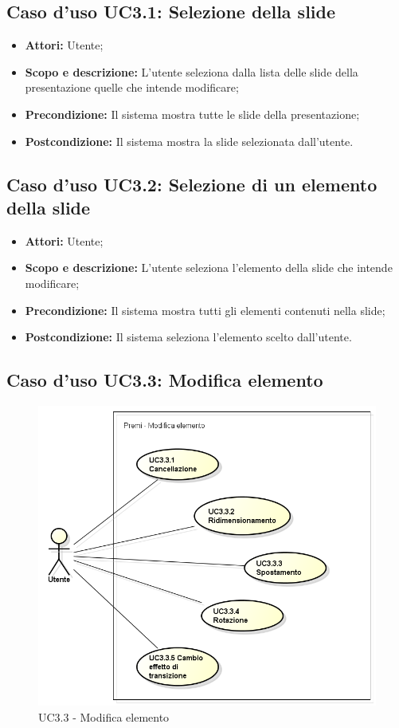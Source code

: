 \subsection{Caso d'uso UC3.1: Selezione della slide}
\begin{itemize}
	\item \textbf{Attori:} Utente;
	\item \textbf{Scopo e descrizione:} L'utente seleziona dalla lista delle slide della presentazione quelle che intende modificare;
	\item \textbf{Precondizione:} Il sistema mostra tutte le slide della presentazione;
	\item \textbf{Postcondizione:} Il sistema mostra la slide selezionata dall'utente.
\end{itemize}

\subsection{Caso d'uso UC3.2: Selezione di un elemento della slide}
\begin{itemize}
	\item \textbf{Attori:} Utente;
	\item \textbf{Scopo e descrizione:} L'utente seleziona l'elemento della slide che intende modificare;
	\item \textbf{Precondizione:} Il sistema mostra tutti gli elementi contenuti nella slide;
	\item \textbf{Postcondizione:} Il sistema seleziona l'elemento scelto dall'utente.
\end{itemize}


\subsection{Caso d'uso UC3.3: Modifica elemento}
\begin{figure}[h] 
	\centering 
	\includegraphics[scale=0.45] {img/UC3.3.png} 
	\caption{UC3.3 - Modifica elemento} 
\end{figure}

